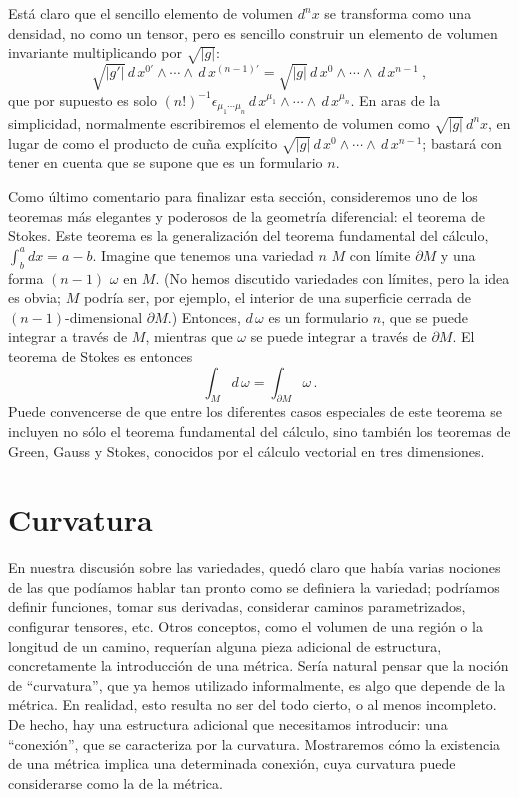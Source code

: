 \documentclass[11pt,b5paper,openany,twoside]{book}
\begin{document}
Está claro que el sencillo elemento de volumen $d^nx$ se transforma como una densidad, no como un tensor, pero es sencillo construir un elemento de volumen invariante multiplicando por $\sqrt{|g|}$:
\begin{equation}
\sqrt{|g'|}\, d\,x^{0'}\wedge \cdots \wedge\, d\,x^{(n-1)'}
= \sqrt{|g|}\, d\,x^0\wedge \cdots \wedge\, d\,x^{n-1}\ ,\label{2.48}
\end{equation}
que por supuesto es solo $(n!)^{-1}\epsilon_{\mu_1\cdots\mu_n} \, d\,x^{\mu_1}\wedge \cdots \wedge \, d\,x^{\mu_n}$.
En aras de la simplicidad, normalmente escribiremos el elemento de volumen como $\sqrt{|g|}\,d^nx$, en lugar de como el producto de cuña explícito $\sqrt{|g|}\, d\,x^0\wedge \cdots \wedge\, d\,x^{n-1}$; bastará con tener en cuenta que se supone que es un formulario $n$.

Como último comentario para finalizar esta sección, consideremos uno de los teoremas más elegantes y poderosos de la geometría diferencial: el teorema de Stokes.
Este teorema es la generalización del teorema fundamental del cálculo, $\int^a_b dx = a-b$.
Imagine que tenemos una variedad $n$ $M$ con límite $\partial M$ y una forma $(n-1)$ $\omega$ en $M$.
(No hemos discutido variedades con límites, pero la idea es obvia; $M$ podría ser, por ejemplo, el interior de una superficie cerrada de $(n-1)$-dimensional $\partial M$.)
Entonces, $ d\,\omega$ es un formulario $n$, que se puede integrar a través de $M$, mientras que $\omega$ se puede integrar a través de $\partial M$.
El teorema de Stokes es entonces
\begin{equation}
\int_M  d\,\omega = \int_{\partial M}\omega\,.\label{2.49}
\end{equation}
Puede convencerse de que entre los diferentes casos especiales de este teorema se incluyen no sólo el teorema fundamental del cálculo, sino también los teoremas de Green, Gauss y Stokes, conocidos por el cálculo vectorial en tres dimensiones.





\chapter{Curvatura}


En nuestra discusión sobre las variedades, quedó claro que había varias nociones de las que podíamos hablar tan pronto como se definiera la variedad; podríamos definir funciones, tomar sus derivadas, considerar caminos parametrizados, configurar tensores, etc.
Otros conceptos, como el volumen de una región o la longitud de un camino, requerían alguna pieza adicional de estructura, concretamente la introducción de una métrica.
Sería natural pensar que la noción de ``curvatura'', que ya hemos utilizado informalmente, es algo que depende de la métrica.
En realidad, esto resulta no ser del todo cierto, o al menos incompleto.
De hecho, hay una estructura adicional que necesitamos introducir: una ``conexión'', que se caracteriza por la curvatura.
Mostraremos cómo la existencia de una métrica implica una determinada conexión, cuya curvatura puede considerarse como la de la métrica.
\end{document}
